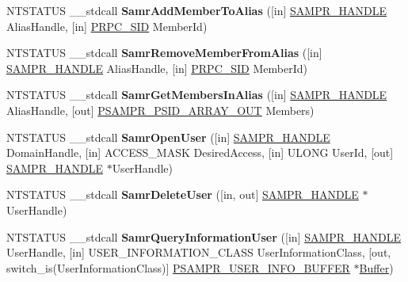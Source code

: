 \begin{DoxyCompactItemize}
\item 
\mbox{\label{interfacesamr_a6ca39cde14a8b8ffb2e8bc7bb1bd3700}} 
N\+T\+S\+T\+A\+T\+US \+\_\+\+\_\+stdcall {\bfseries Samr\+Add\+Member\+To\+Alias} (\mbox{[}in\mbox{]} \hyperlink{interfacevoid}{S\+A\+M\+P\+R\+\_\+\+H\+A\+N\+D\+LE} Alias\+Handle, \mbox{[}in\mbox{]} \hyperlink{struct___r_p_c___s_i_d}{P\+R\+P\+C\+\_\+\+S\+ID} Member\+Id)
\item 
\mbox{\label{interfacesamr_afb561b1a03a880cad47b2080ce7cb5e8}} 
N\+T\+S\+T\+A\+T\+US \+\_\+\+\_\+stdcall {\bfseries Samr\+Remove\+Member\+From\+Alias} (\mbox{[}in\mbox{]} \hyperlink{interfacevoid}{S\+A\+M\+P\+R\+\_\+\+H\+A\+N\+D\+LE} Alias\+Handle, \mbox{[}in\mbox{]} \hyperlink{struct___r_p_c___s_i_d}{P\+R\+P\+C\+\_\+\+S\+ID} Member\+Id)
\item 
\mbox{\label{interfacesamr_a4ec161539ea7d81cfab208850dc0dfd5}} 
N\+T\+S\+T\+A\+T\+US \+\_\+\+\_\+stdcall {\bfseries Samr\+Get\+Members\+In\+Alias} (\mbox{[}in\mbox{]} \hyperlink{interfacevoid}{S\+A\+M\+P\+R\+\_\+\+H\+A\+N\+D\+LE} Alias\+Handle, \mbox{[}out\mbox{]} \hyperlink{struct___s_a_m_p_r___p_s_i_d___a_r_r_a_y___o_u_t}{P\+S\+A\+M\+P\+R\+\_\+\+P\+S\+I\+D\+\_\+\+A\+R\+R\+A\+Y\+\_\+\+O\+UT} Members)
\item 
\mbox{\label{interfacesamr_a2c4fdfb52d2d0de5ab9316f6203d4839}} 
N\+T\+S\+T\+A\+T\+US \+\_\+\+\_\+stdcall {\bfseries Samr\+Open\+User} (\mbox{[}in\mbox{]} \hyperlink{interfacevoid}{S\+A\+M\+P\+R\+\_\+\+H\+A\+N\+D\+LE} Domain\+Handle, \mbox{[}in\mbox{]} A\+C\+C\+E\+S\+S\+\_\+\+M\+A\+SK Desired\+Access, \mbox{[}in\mbox{]} U\+L\+O\+NG User\+Id, \mbox{[}out\mbox{]} \hyperlink{interfacevoid}{S\+A\+M\+P\+R\+\_\+\+H\+A\+N\+D\+LE} $\ast$User\+Handle)
\item 
\mbox{\label{interfacesamr_aec8efe12272cbc629e774747f023cee0}} 
N\+T\+S\+T\+A\+T\+US \+\_\+\+\_\+stdcall {\bfseries Samr\+Delete\+User} (\mbox{[}in, out\mbox{]} \hyperlink{interfacevoid}{S\+A\+M\+P\+R\+\_\+\+H\+A\+N\+D\+LE} $\ast$User\+Handle)
\item 
\mbox{\label{interfacesamr_aca298b872a2f41c4ebbe9d2b037264e9}} 
N\+T\+S\+T\+A\+T\+US \+\_\+\+\_\+stdcall {\bfseries Samr\+Query\+Information\+User} (\mbox{[}in\mbox{]} \hyperlink{interfacevoid}{S\+A\+M\+P\+R\+\_\+\+H\+A\+N\+D\+LE} User\+Handle, \mbox{[}in\mbox{]} U\+S\+E\+R\+\_\+\+I\+N\+F\+O\+R\+M\+A\+T\+I\+O\+N\+\_\+\+C\+L\+A\+SS User\+Information\+Class, \mbox{[}out, switch\+\_\+is(User\+Information\+Class)\mbox{]} \hyperlink{union___s_a_m_p_r___u_s_e_r___i_n_f_o___b_u_f_f_e_r}{P\+S\+A\+M\+P\+R\+\_\+\+U\+S\+E\+R\+\_\+\+I\+N\+F\+O\+\_\+\+B\+U\+F\+F\+ER} $\ast$\hyperlink{class_buffer}{Buffer})

\end{DoxyCompactItemize}
